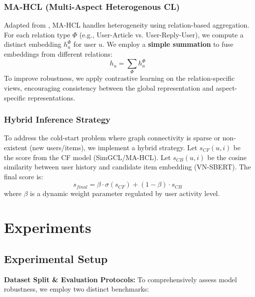 \documentclass[11pt]{article}
\begin{document}
\subsubsection{MA-HCL (Multi-Aspect Heterogenous CL)}
Adapted from \citet{shi2020hgrec}, MA-HCL handles heterogeneity using relation-based aggregation. For each relation type $\Phi$ (e.g., User-Article vs. User-Reply-User), we compute a distinct embedding $h_u^{\Phi}$ for user $u$.
We employ a \textbf{simple summation} to fuse embeddings from different relations:
\begin{equation}
  h_u = \sum_{\Phi} h_u^{\Phi}
\end{equation}
To improve robustness, we apply contrastive learning on the relation-specific views, encouraging consistency between the global representation and aspect-specific representations.

\subsubsection{Hybrid Inference Strategy}
To address the cold-start problem where graph connectivity is sparse or non-existent (new users/items), we implement a hybrid strategy.
Let $s_{CF}(u, i)$ be the score from the CF model (SimGCL/MA-HCL).
Let $s_{CB}(u, i)$ be the cosine similarity between user history and candidate item embedding (VN-SBERT).
The final score is:
\begin{equation}
  s_{final} = \beta \cdot \sigma(s_{CF}) + (1-\beta) \cdot s_{CB}
\end{equation}
where $\beta$ is a dynamic weight parameter regulated by user activity level.

\section{Experiments}

\subsection{Experimental Setup}
\textbf{Dataset Split \& Evaluation Protocols:} To comprehensively assess model robustness, we employ two distinct benchmarks:
\end{document}
